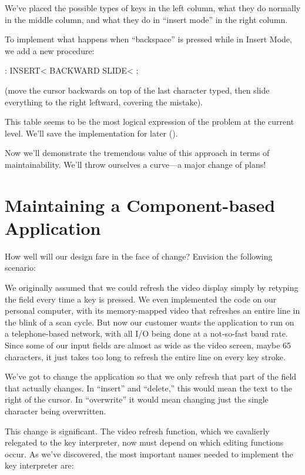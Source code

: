 We've placed the possible types of keys in the left column, what they do
normally in the middle column, and what they do in ``insert mode'' in the
right column.

To implement what happens when ``backspace'' is pressed while in
Insert Mode, we add a new procedure:

\begin{Code}
: INSERT< BACKWARD SLIDE< ;
\end{Code}

(move the cursor backwards on top of the last character typed, then slide
everything to the right leftward, covering the mistake).

This table seems to be the most logical expression of the problem at
the current level. We'll save the implementation for later ().

Now we'll demonstrate the tremendous value of this approach in
terms of maintainability. We'll throw ourselves a curve---a major change
of plans!

\section{Maintaining a Component-based Application}

How well will our design fare in the face of change? Envision the following
scenario:

We originally assumed that we could refresh the video display simply
by retyping the field every time a key is pressed. We even implemented
the code on our personal computer, with its memory-mapped video that
refreshes an entire line in the blink of a scan cycle. But now our
customer wants the application to run on a telephone-based network,
with all I/O being done at a not-so-fast baud rate. Since some of our
input fields are almost as wide as the video screen, maybe 65
characters, it just takes too long to refresh the entire line on every
key stroke.

We've got to change the application so that we only refresh that
part of the field that actually changes. In ``insert'' and ``delete,'' this
would mean the text to the right of the cursor. In ``overwrite'' it would
mean changing just the single character being overwritten.

This change is significant. The video refresh function, which we
cavalierly relegated to the key interpreter, now must depend on which
editing functions occur. As we've discovered, the most important names
needed to implement the key interpreter are:

